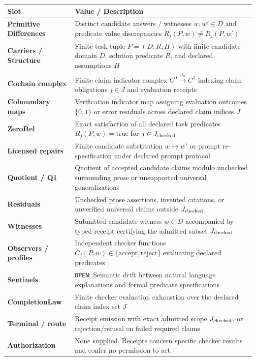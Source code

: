 \documentclass[
  11pt,
]{article}
\newcommand{\passthrough}[1]{#1}
\begin{document}
\begin{longtable}[]{@{}
  >{\raggedright\arraybackslash}p{}
  >{\raggedright\arraybackslash}p{}@{}}
\toprule\noalign{}
\begin{minipage}[b]{\linewidth}\raggedright
Slot
\end{minipage} & \begin{minipage}[b]{\linewidth}\raggedright
Value / Description
\end{minipage} \\
\midrule\noalign{}
\endhead
\bottomrule\noalign{}
\endlastfoot
\textbf{Primitive Differences} & Distinct candidate answers / witnesses
\(w, w' \in D\) and predicate value discrepancies
\(R_j(P, w) \neq R_j(P, w')\) \\
\textbf{Carriers / Structure} & Finite task tuple \(P = (D, R, H)\) with
finite candidate domain \(D\), solution predicate \(R\), and declared
assumptions \(H\) \\
\textbf{Cochain complex} & Finite claim indicator complex
\(C^0 \xrightarrow{d_0} C^1\) indexing claim obligations \(j \in J\) and
evaluation receipts \\
\textbf{Coboundary maps} & Verification indicator map assigning
evaluation outcomes \(\{0, 1\}\) or error residuals across declared
claim indices \(J\) \\
\textbf{ZeroRel} & Exact satisfaction of all declared task predicates
\(R_j(P, w) = \text{true}\) for \(j \in J_{\rm checked}\) \\
\textbf{Licensed repairs} & Finite candidate substitution
\(w \mapsto w'\) or prompt re-specification under declared prompt
protocol \\
\textbf{Quotient / Q1} & Quotient of accepted candidate claims modulo
unchecked surrounding prose or unsupported universal generalizations \\
\textbf{Residuals} & Unchecked prose assertions, invented citations, or
unverified universal claims outside \(J_{\rm checked}\) \\
\textbf{Witnesses} & Submitted candidate witness \(w \in D\) accompanied
by typed receipt certifying the admitted subset \(J_{\rm checked}\) \\
\textbf{Observers / profiles} & Independent checker functions
\(C_j(P, w) \in \{\text{accept}, \text{reject}\}\) evaluating declared
predicates \\
\textbf{Sentinels} & \passthrough{\lstinline!OPEN!}: Semantic drift
between natural language explanations and formal predicate
specifications \\
\textbf{CompletionLaw} & Finite checker evaluation exhaustion over the
declared claim index set \(J\) \\
\textbf{Terminal / route} & Receipt emission with exact admitted scope
\(J_{\rm checked}\), or rejection/refusal on failed required claims \\
\textbf{Authorization} & None supplied. Receipts concern specific
checker results and confer no permission to act. \\
\end{longtable}
\end{document}
